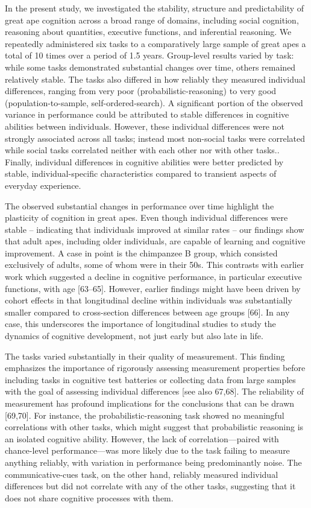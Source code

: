 \documentclass[
  man,floatsintext]{apa6}
\begin{document}
In the present study, we investigated the stability, structure and predictability of great ape cognition across a broad range of domains, including social cognition, reasoning about quantities, executive functions, and inferential reasoning. We repeatedly administered six tasks to a comparatively large sample of great apes a total of 10 times over a period of 1.5 years. Group-level results varied by task: while some tasks demonstrated substantial changes over time, others remained relatively stable. The tasks also differed in how reliably they measured individual differences, ranging from very poor (probabilistic-reasoning) to very good (population-to-sample, self-ordered-search). A significant portion of the observed variance in performance could be attributed to stable differences in cognitive abilities between individuals. However, these individual differences were not strongly associated across all tasks; instead most non-social tasks were correlated while social tasks correlated neither with each other nor with other tasks.. Finally, individual differences in cognitive abilities were better predicted by stable, individual-specific characteristics compared to transient aspects of everyday experience.

The observed substantial changes in performance over time highlight the plasticity of cognition in great apes. Even though individual differences were stable -- indicating that individuals improved at similar rates -- our findings show that adult apes, including older individuals, are capable of learning and cognitive improvement. A case in point is the chimpanzee B group, which consisted exclusively of adults, some of whom were in their 50s. This contrasts with earlier work which suggested a decline in cognitive performance, in particular executive functions, with age {[}63--65{]}. However, earlier findings might have been driven by cohort effects in that longitudinal decline within individuals was substantially smaller compared to cross-section differences between age groups {[}66{]}. In any case, this underscores the importance of longitudinal studies to study the dynamics of cognitive development, not just early but also late in life.

The tasks varied substantially in their quality of measurement. This finding emphasizes the importance of rigorously assessing measurement properties before including tasks in cognitive test batteries or collecting data from large samples with the goal of assessing individual differences {[}see also 67,68{]}. The reliability of measurement has profound implications for the conclusions that can be drawn {[}69,70{]}. For instance, the probabilistic-reasoning task showed no meaningful correlations with other tasks, which might suggest that probabilistic reasoning is an isolated cognitive ability. However, the lack of correlation---paired with chance-level performance---was more likely due to the task failing to measure anything reliably, with variation in performance being predominantly noise. The communicative-cues task, on the other hand, reliably measured individual differences but did not correlate with any of the other tasks, suggesting that it does not share cognitive processes with them.
\end{document}
